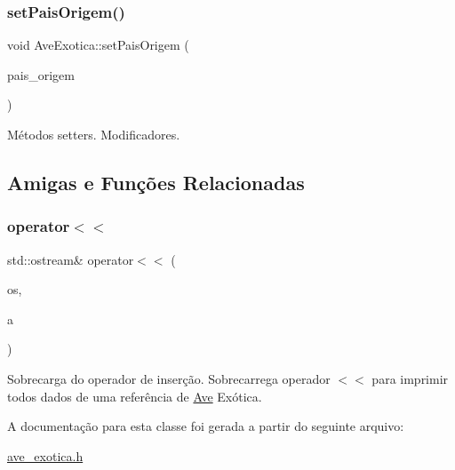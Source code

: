 \subsubsection{\texorpdfstring{set\+Pais\+Origem()}{setPaisOrigem()}}
{\footnotesize\ttfamily void Ave\+Exotica\+::set\+Pais\+Origem (\begin{DoxyParamCaption}\item[{std\+::string}]{pais\+\_\+origem }\end{DoxyParamCaption})}

Métodos setters. Modificadores. 

\subsection{Amigas e Funções Relacionadas}
\mbox{\label{classAveExotica_a767cee77b7786ba8e6c3294697d01f05}} 
\subsubsection{\texorpdfstring{operator$<$$<$}{operator<<}}
{\footnotesize\ttfamily std\+::ostream\& operator$<$$<$ (\begin{DoxyParamCaption}\item[{std\+::ostream \&}]{os,  }\item[{\hyperlink{classAveExotica}{Ave\+Exotica} \&}]{a }\end{DoxyParamCaption})\hspace{0.3cm}{\ttfamily [friend]}}

Sobrecarga do operador de inserção. Sobrecarrega operador $<$$<$ para imprimir todos dados de uma referência de \hyperlink{classAve}{Ave} Exótica. 

A documentação para esta classe foi gerada a partir do seguinte arquivo\+:\begin{DoxyCompactItemize}
\item 
\hyperlink{ave__exotica_8h}{ave\+\_\+exotica.\+h}\end{DoxyCompactItemize}

